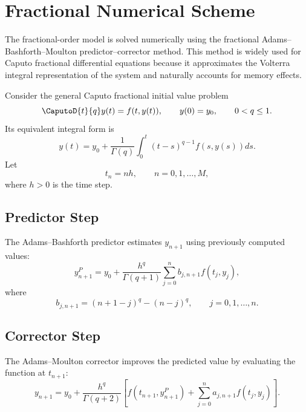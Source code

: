 \section{Fractional Numerical Scheme}

The fractional-order model is solved numerically using the fractional Adams--Bashforth--Moulton predictor--corrector method. This method is widely used for Caputo fractional differential equations because it approximates the Volterra integral representation of the system and naturally accounts for memory effects.

Consider the general Caputo fractional initial value problem
\begin{equation}
\CaputoD{t}{q}y(t)=f(t,y(t)),
\qquad
y(0)=y_0,
\qquad
0<q\leq1.
\label{eq:general_fivp}
\end{equation}
Its equivalent integral form is
\begin{equation}
y(t)=y_0+\frac{1}{\Gamma(q)}
\int_0^t(t-s)^{q-1}f(s,y(s))ds.
\label{eq:general_integral}
\end{equation}
Let
\[
t_n=nh,\qquad n=0,1,\ldots,M,
\]
where $h>0$ is the time step.

\subsection{Predictor Step}

The Adams--Bashforth predictor estimates $y_{n+1}$ using previously computed values:
\begin{equation}
y_{n+1}^{P}
=
y_0+\frac{h^q}{\Gamma(q+1)}
\sum_{j=0}^{n} b_{j,n+1} f(t_j,y_j),
\label{eq:correct_predictor}
\end{equation}
where
\begin{equation}
b_{j,n+1}=(n+1-j)^q-(n-j)^q,
\qquad
j=0,1,\ldots,n.
\label{eq:correct_predictor_weights}
\end{equation}

\subsection{Corrector Step}

The Adams--Moulton corrector improves the predicted value by evaluating the function at $t_{n+1}$:
\begin{equation}
y_{n+1}
=
y_0+
\frac{h^q}{\Gamma(q+2)}
\left[
f(t_{n+1},y_{n+1}^{P})
+
\sum_{j=0}^{n}a_{j,n+1}f(t_j,y_j)
\right].
\label{eq:correct_corrector}
\end{equation}

